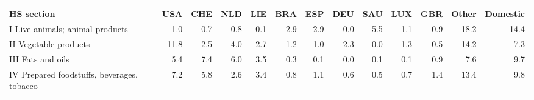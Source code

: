 \begin{tabular}{lrrrrrrrrrrrr}
\toprule
HS section & USA & CHE & NLD & LIE & BRA & ESP & DEU & SAU & LUX & GBR & Other & Domestic \\
\midrule
I Live animals; animal products & 1.0 & 0.7 & 0.8 & 0.1 & 2.9 & 2.9 & 0.0 & 5.5 & 1.1 & 0.9 & 18.2 & 14.4 \\
II Vegetable products & 11.8 & 2.5 & 4.0 & 2.7 & 1.2 & 1.0 & 2.3 & 0.0 & 1.3 & 0.5 & 14.2 & 7.3 \\
III Fats and oils & 5.4 & 7.4 & 6.0 & 3.5 & 0.3 & 0.1 & 0.0 & 0.1 & 0.1 & 0.9 & 7.6 & 9.7 \\
IV Prepared foodstuffs, beverages, tobacco & 7.2 & 5.8 & 2.6 & 3.4 & 0.8 & 1.1 & 0.6 & 0.5 & 0.7 & 1.4 & 13.4 & 9.8 \\
\bottomrule
\end{tabular}
